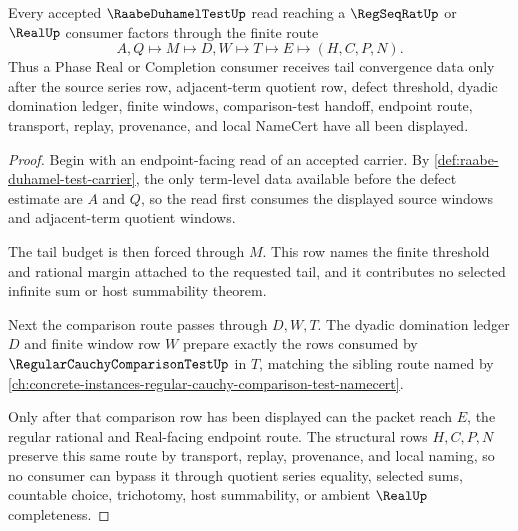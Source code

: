 \begin{theorem}\label{thm:raabe-duhamel-test-tail-handoff}
Every accepted $\RaabeDuhamelTestUp$ read reaching a $\RegSeqRatUp$ or $\RealUp$ consumer factors through the finite route
$$
A,Q\longmapsto M\longmapsto D,W\longmapsto T\longmapsto E\longmapsto (H,C,P,N).
$$
Thus a Phase Real or Completion consumer receives tail convergence data only after the source series row, adjacent-term quotient row, defect threshold, dyadic domination ledger, finite windows, comparison-test handoff, endpoint route, transport, replay, provenance, and local NameCert have all been displayed.
\end{theorem}
\begin{proof}
Begin with an endpoint-facing read of an accepted carrier. By \autoref{def:raabe-duhamel-test-carrier}, the only term-level data available before the defect estimate are $A$ and $Q$, so the read first consumes the displayed source windows and adjacent-term quotient windows.

The tail budget is then forced through $M$. This row names the finite threshold and rational margin attached to the requested tail, and it contributes no selected infinite sum or host summability theorem.

Next the comparison route passes through $D,W,T$. The dyadic domination ledger $D$ and finite window row $W$ prepare exactly the rows consumed by $\RegularCauchyComparisonTestUp$ in $T$, matching the sibling route named by \autoref{ch:concrete-instances-regular-cauchy-comparison-test-namecert}.

Only after that comparison row has been displayed can the packet reach $E$, the regular rational and Real-facing endpoint route. The structural rows $H,C,P,N$ preserve this same route by transport, replay, provenance, and local naming, so no consumer can bypass it through quotient series equality, selected sums, countable choice, trichotomy, host summability, or ambient $\RealUp$ completeness.
\end{proof}



